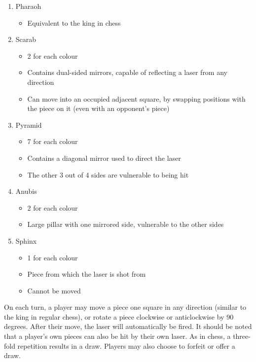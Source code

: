 \documentclass[../main/main.tex]{subfiles}
\begin{document}
\begin{enumerate}
\item Pharaoh
    \begin{itemize}[label=\hyp{}]
    \item Equivalent to the king in chess
    \end{itemize}
\item Scarab
    \begin{itemize}[label=\hyp{}]
    \item 2 for each colour
    \item Contains dual-sided mirrors, capable of reflecting a laser from any direction
    \item Can move into an occupied adjacent square, by swapping positions with the piece on it (even with an opponent’s piece)
    \end{itemize}
\item Pyramid
    \begin{itemize}[label=\hyp{}]
    \item 7 for each colour
    \item Contains a diagonal mirror used to direct the laser
    \item The other 3 out of 4 sides are vulnerable to being hit
    \end{itemize}
\item Anubis
    \begin{itemize}[label=\hyp{}]
    \item 2 for each colour
    \item Large pillar with one mirrored side, vulnerable to the other sides
    \end{itemize}
\item Sphinx
    \begin{itemize}[label=\hyp{}]
    \item 1 for each colour
    \item Piece from which the laser is shot from
    \item Cannot be moved
    \end{itemize}
\end{enumerate}

On each turn, a player may move a piece one square in any direction (similar to the king in regular chess), or rotate a piece clockwise or anticlockwise by 90 degrees. After their move, the laser will automatically be fired. It should be noted that a player’s own pieces can also be hit by their own laser. As in chess, a three-fold repetition results in a draw. Players may also choose to forfeit or offer a draw.
\end{document}
